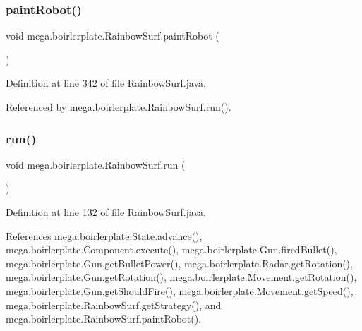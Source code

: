 \subsubsection{\texorpdfstring{paint\+Robot()}{paintRobot()}}
{\footnotesize\ttfamily void mega.\+boirlerplate.\+Rainbow\+Surf.\+paint\+Robot (\begin{DoxyParamCaption}{ }\end{DoxyParamCaption})}



Definition at line 342 of file Rainbow\+Surf.\+java.



Referenced by mega.\+boirlerplate.\+Rainbow\+Surf.\+run().

\mbox{\label{classmega_1_1boirlerplate_1_1_rainbow_surf_a88781c384a36b2bfde150cd613211911}} 
\subsubsection{\texorpdfstring{run()}{run()}}
{\footnotesize\ttfamily void mega.\+boirlerplate.\+Rainbow\+Surf.\+run (\begin{DoxyParamCaption}{ }\end{DoxyParamCaption})}



Definition at line 132 of file Rainbow\+Surf.\+java.



References mega.\+boirlerplate.\+State.\+advance(), mega.\+boirlerplate.\+Component.\+execute(), mega.\+boirlerplate.\+Gun.\+fired\+Bullet(), mega.\+boirlerplate.\+Gun.\+get\+Bullet\+Power(), mega.\+boirlerplate.\+Radar.\+get\+Rotation(), mega.\+boirlerplate.\+Gun.\+get\+Rotation(), mega.\+boirlerplate.\+Movement.\+get\+Rotation(), mega.\+boirlerplate.\+Gun.\+get\+Should\+Fire(), mega.\+boirlerplate.\+Movement.\+get\+Speed(), mega.\+boirlerplate.\+Rainbow\+Surf.\+get\+Strategy(), and mega.\+boirlerplate.\+Rainbow\+Surf.\+paint\+Robot().

\mbox{\label{classmega_1_1boirlerplate_1_1_rainbow_surf_aea60c20e73fd0d6a9c9f03aedb629691}} 
